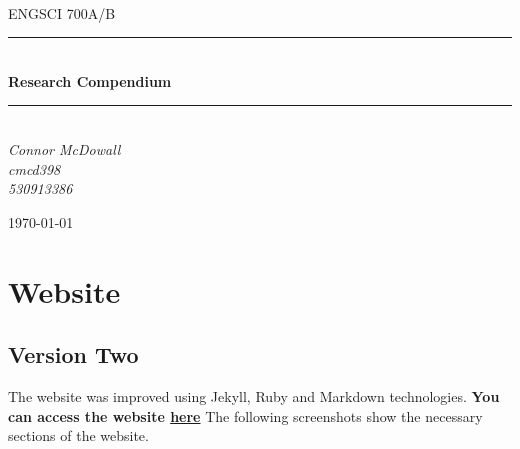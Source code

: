 \documentclass[12pt]{article}
\begin{document}
\begin{titlepage}
	\newcommand{\HRule}{\rule{\linewidth}{0.5mm}} %
	
	\center
	
	
	\textsc{\LARGE }\\[1.5cm] %
	
	\textsc{\Large ENGSCI 700A/B}\\[0.5cm] %
	
	
	\HRule\\[0.5cm]
	
	{\huge\bfseries Research Compendium}\\[0.4cm] %
	
	\HRule\\[0.5cm]
	
	
	{\large\textit{Connor McDowall \\cmcd398 \\530913386}}\\
	
	
	\vfill\vfill\vfill %
	
	{\large\today} %
	 
	
	\vfill %
	
\end{titlepage}
\tableofcontents
\listoffigures
\listoftables
\newpage
\section{Website}
\subsection{Version Two}
The website was improved using Jekyll, Ruby and Markdown technologies.
\textbf{You can access the website \href{https://connormcdowall.com/gocpi.html}{here}}
The following screenshots show the necessary sections of the website.
\end{document}
